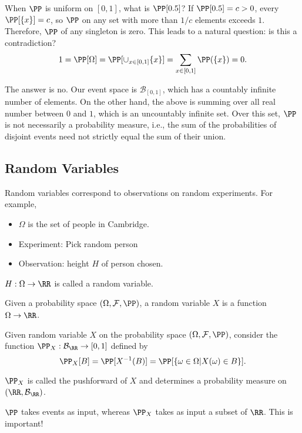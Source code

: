 When $\PP$ is uniform on $[0,1]$, what is $\PP[{0.5}]$? If $\PP[{0.5}]=c > 0$, every $\PP[\{x\}] = c$, so $\PP$ on any set with more than $1/c$ elements exceeds $1$. Therefore, $\PP$ of any singleton is zero. This leads to a natural question: is this a contradiction?
\[1 = \PP[\Omega] = \PP[\cup_{x\in [0,1]}\{x\}] = \sum_{x\in [0,1]}\PP(\{x\}) = 0.\]

The answer is no. Our event space is $\mathcal{B}_{[0,1]}$, which has a countably infinite number of elements. On the other hand, the above is summing over all real number between $0$ and $1$, which is an uncountably infinite set. Over this set, $\PP$ is not necessarily a probability measure, i.e., the sum of the probabilities of disjoint events need not strictly equal the sum of their union. 

\subsection{Random Variables}

Random variables correspond to observations on random experiments. For example, 
\begin{itemize}
    \item $\Omega$ is the set of people in Cambridge.
    \item Experiment: Pick random person
    \item Observation: height $H$ of person chosen. 
\end{itemize}

$H: \Omega\rightarrow \RR$ is called a \ac{random variable}.

\begin{definition}

Given a probability space $(\Omega, \mathcal{F}, \PP)$, a random variable $X$ is a function $\Omega\rightarrow \RR$. 
\end{definition}

\begin{definition}

Given random variable $X$ on the probability space $(\Omega, \mathcal{F}, \PP)$, consider the function $\PP_X : \mathcal{B}_{\RR}\rightarrow [0,1]$ defined by 
\[\PP_{X}[B] =\PP[X^{-1}(B)] = \PP[\{\omega\in \Omega \vert X(\omega)\in B\}].\]

$\PP_X$ is called the \ac{pushforward} of $X$ and determines a probability measure on $(\RR, \mathcal{B}_{\RR})$. 
\end{definition}

$\PP$ takes events as input, whereas $\PP_X$ takes as input a subset of $\RR$. This is important!

